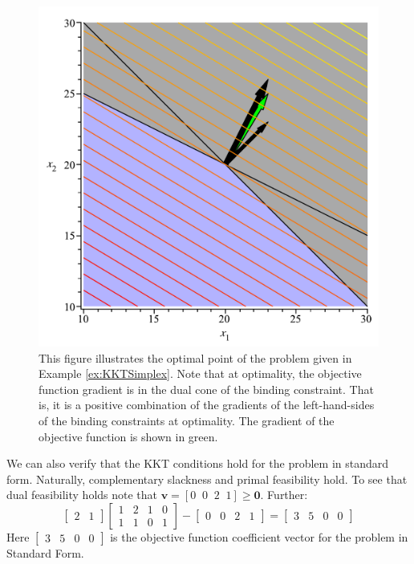 \begin{example}
\begin{figure}[htbp]
\centering
\includegraphics[scale=0.35]{LeatherMakerKKT.pdf}
\caption{This figure illustrates the optimal point of the problem given in Example \ref{ex:KKTSimplex}. Note that at optimality, the objective function gradient is in the dual cone of the binding constraint. That is, it is a positive combination of the gradients of the left-hand-sides of the binding constraints at optimality. The gradient of the objective function is shown in green.}
\label{fig:KKTSimplex}
\end{figure}

We can also verify that the KKT conditions hold for the problem in standard form. Naturally, complementary slackness and primal feasibility hold. To see that dual feasibility holds note that $\mathbf{v} = [0\;\;0\;\;2\;\;1] \geq \mathbf{0}$. Further:
\begin{displaymath}
\begin{bmatrix}2 & 1\end{bmatrix}
\begin{bmatrix} 1 & 2 & 1 & 0\\
1 & 1 & 0 & 1\end{bmatrix} - \begin{bmatrix}
0 & 0 & 2 & 1\end{bmatrix} = \begin{bmatrix} 3 & 5 & 0 & 0\end{bmatrix}
\end{displaymath} 
Here $\begin{bmatrix} 3 & 5 & 0 & 0\end{bmatrix}$ is the objective function coefficient vector for the problem in Standard Form.
\label{ex:KKTSimplex}
\end{example}

